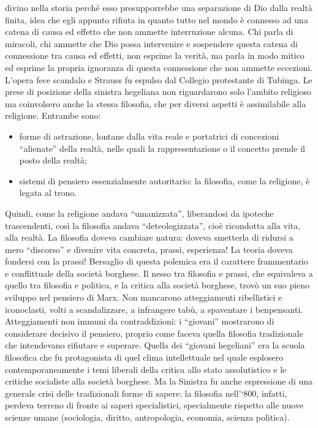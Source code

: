 \documentclass[a4paper,12pt,oneside,openany]{book}%
\begin{document}
divino nella storia perché esso presupporrebbe una separazione di Dio dalla realtà finita, idea che egli appunto rifiuta in quanto tutto nel mondo è connesso ad una catena di causa ed effetto che non ammette interruzione alcuna. Chi parla di miracoli, chi ammette che Dio possa intervenire e sospendere questa catena di connessione tra causa ed effetti, non esprime la verità, ma parla in modo mitico ed esprime la propria ignoranza di questa connessione che non ammette eccezioni. L’opera fece scandalo e Strauss fu espulso dal Collegio protestante di Tubinga. Le prese di posizione della sinistra hegeliana non riguardarono solo l’ambito religioso ma coinvolsero anche la stessa filosofia, che per diversi aspetti è assimilabile alla religione. Entrambe sono:

\begin{itemize}
	\item forme di astrazione, lontane dalla vita reale e portatrici di concezioni “alienate” della realtà, nelle quali la rappresentazione o il concetto prende il posto della realtà;
	\item sistemi di pensiero essenzialmente autoritario: la filosofia, come la religione, è legata al trono.
\end{itemize}	

Quindi, come la religione andava “umanizzata”, liberandosi da ipoteche trascendenti, così la filosofia andava “deteologizzata”, cioè ricondotta alla vita, alla realtà. La filosofia doveva cambiare natura: doveva smetterla di ridursi a mero “discorso” e divenire vita concreta, prassi, esperienza! La teoria doveva fondersi con la prassi! Bersaglio di questa polemica era il carattere frammentario e conflittuale della società borghese. Il nesso tra filosofia e prassi, che equivaleva a quello tra filosofia e politica, e la critica alla società borghese, trovò un suo pieno sviluppo nel pensiero di Marx. Non mancarono atteggiamenti ribellistici e iconoclasti, volti a scandalizzare, a infrangere tabù, a spaventare i benpensanti. Atteggiamenti non immuni da contraddizioni: i “giovani” mostrarono di considerare decisivo il pensiero, proprio come faceva quella filosofia tradizionale che intendevano rifiutare e superare.  Quella dei “giovani hegeliani” era la scuola filosofica che fu protagonista di quel clima intellettuale nel quale esplosero contemporaneamente i temi liberali della critica allo stato assolutistico e le critiche socialiste alla società borghese. Ma la Sinistra fu anche espressione di una generale crisi delle tradizionali forme di sapere: la filosofia nell’‘800, infatti, perdeva terreno di fronte ai saperi specialistici, specialmente rispetto alle nuove scienze umane (sociologia, diritto, antropologia, economia, scienza politica).
	
\end{document}

